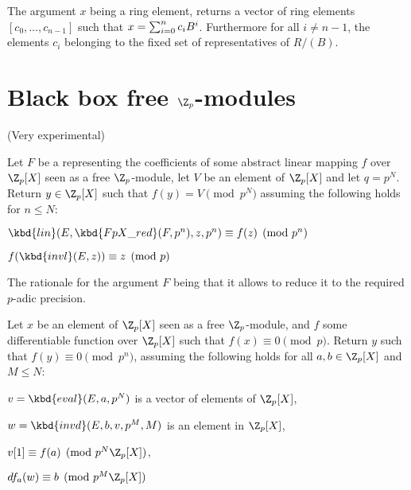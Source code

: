 The argument $x$ being a ring element,  returns a vector of
ring elements $[c_0,\ldots,c_{n-1}]$ such that $x = \sum_{i=0}^n c_i\*B^i$.
Furthermore for all $i\ne n-1$, the elements $c_i$ belonging to the fixed set
of representatives of $R/(B)$.

\section{Black box free $\Z_p$-modules}

(Very experimental)


Let $F$ be a  representing the coefficients of some abstract
linear mapping $f$ over $\Z_p[X]$ seen as a free $\Z_p$-module, let $V$ be
an element of $\Z_p[X]$ and let $q = p^N$.  Return $y\in\Z_p[X]$ such that
$f(y)=V\pmod{p^N}$ assuming the following holds for $n\leq N$:

\item $\kbd{lin}(E, \kbd{FpX\_red}(F, p^n), z, p^n) \equiv f(z) \pmod{p^n}$

\item $f(\kbd{invl}(E, z)) \equiv z \pmod{p}$

The rationale for the argument $F$ being that it allows 
to reduce it to the required $p$-adic precision.


Let $x$ be an element of $\Z_p[X]$ seen as a free  $\Z_p$-module, and $f$
some differentiable function over $\Z_p[X]$ such that $f(x) \equiv 0
\pmod{p}$. Return $y$ such that $f(y) \equiv 0\pmod{p^n}$, assuming the
following holds for all $a, b\in \Z_p[X]$ and $M\leq N$:

\item $v = \kbd{eval}(E,a,p^N)$ is a vector of elements of $\Z_p[X]$,

\item $w = \kbd{invd}(E,b,v,p^M,M)$ is an element in $\Z_p[X]$,

\item $v[1] \equiv f(a) \pmod{p^N\Z_p[X]}$,

\item $df_a(w) \equiv b \pmod{p^M\Z_p[X]}$

